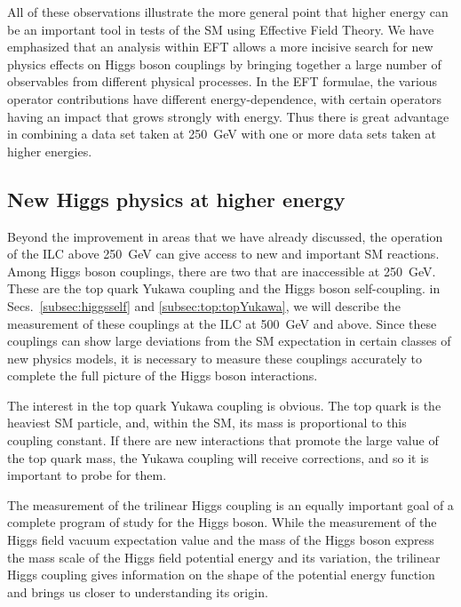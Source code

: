 All of these observations illustrate the more general point that
higher energy can be an important tool in tests of the SM
using Effective Field Theory.   We have emphasized that an analysis
within  EFT allows a more incisive search for new physics effects on
Higgs boson couplings by bringing together a large number of
observables from different physical processes.
 In the EFT formulae, the various operator contributions have different
energy-dependence, with certain operators having an impact that grows 
strongly with energy.  Thus there is great advantage in combining a
data set taken at 250~GeV with one or more data sets taken at higher
energies.

\subsection{New Higgs physics at higher energy}

Beyond the improvement in areas that we have already discussed, the
operation of the ILC above 250~GeV can give access to new and
important SM reactions.   Among Higgs boson couplings, there are two
that are 
inaccessible at 250~GeV.  These are the top quark Yukawa coupling and
the Higgs boson self-coupling.   in Secs.~\ref{subsec:higgsself}
and \ref{subsec:top:topYukawa}, we will describe the measurement of
these couplings at the ILC at 500~GeV and above.   Since these
couplings can show large deviations from the SM expectation in certain
classes of new physics models, it is necessary to measure these
couplings accurately to complete the full picture of the Higgs boson
interactions.

The interest in the top quark Yukawa coupling is obvious.   The top
quark is the heaviest SM particle, and, within the SM, its mass is
proportional to this coupling constant.   If there are new
interactions that promote the large value of the top quark mass, the
Yukawa coupling will receive corrections, and so it is important to
probe for them.

The measurement of the trilinear Higgs coupling is an equally  important goal
of a complete program of study for the Higgs boson.  While the
measurement of the Higgs field vacuum expectation value and the mass
of the Higgs boson express the mass scale of the Higgs field potential
energy and its variation, the trilinear Higgs coupling gives
information on the shape of the potential energy function and brings
us closer to understanding its origin.

